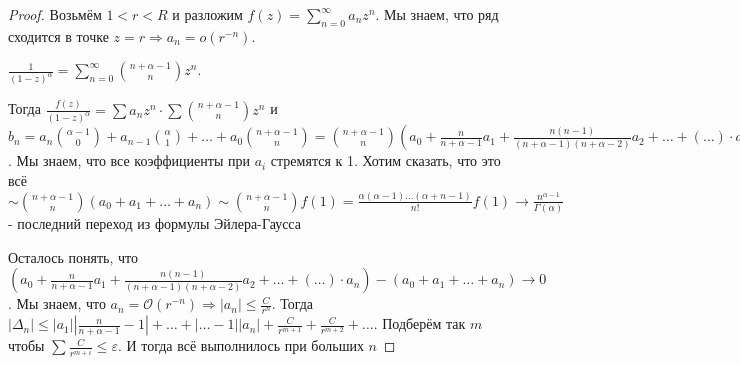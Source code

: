 \begin{proof}
    Возьмём $1 < r < R$ и разложим $f(z) = \sum_{n = 0}^{\infty} a_nz^n$. Мы знаем, что ряд сходится в точке 
    $z = r \Rightarrow a_n = o(r^{-n})$.

    $\frac{1}{(1 - z)^\alpha} = \sum_{n = 0}^{\infty} \binom{n + \alpha - 1}{n} z^n$.

    Тогда $\frac{f(z)}{(1 - z)^\alpha} = \sum a_nz^n \cdot \sum \binom{n + \alpha - 1}{n} z^n$ и $b_n = a_n \binom{\alpha - 1}{0} + a_{n - 1}\binom{\alpha}{1} + \ldots + a_0 \binom{n + \alpha - 1}{n} = 
    \binom{n + \alpha - 1}{n} (a_0 + \frac{n}{n + \alpha - 1}a_1 + \frac{n(n - 1)}{(n + \alpha - 1)(n + \alpha -2)}a_2 + \ldots + (\ldots)\cdot a_n)$. Мы знаем, что все коэффициенты при $a_i$ стремятся к 1.
    Хотим сказать, что это всё $\sim \binom{n + \alpha - 1}{n} (a_0 + a_1 + \ldots + a_n) \sim \binom{n + \alpha - 1}{n} f(1) = \frac{\alpha(\alpha - 1) \ldots (\alpha + n - 1)}{n!} f(1) \rightarrow \frac{n^{\alpha - 1}}{\Gamma(\alpha)}$ - последний переход из формулы Эйлера-Гаусса

    Осталось понять, что $(a_0 + \frac{n}{n + \alpha - 1}a_1 + \frac{n(n - 1)}{(n + \alpha - 1)(n + \alpha -2)}a_2 + \ldots + (\ldots)\cdot a_n) - (a_0 + a_1 + \ldots +a_n) \rightarrow 0$. Мы знаем, что 
    $a_n = \mathcal{O}(r^{-n}) \Rightarrow |a_n| \leqslant \frac{C}{r^n}$. Тогда
    $|\Delta_n| \leqslant |a_1| |\frac{n}{n + \alpha - 1} - 1| + \ldots + |\ldots - 1| |a_n| + \frac{C}{r^{m + 1}} + \frac{C}{r^{m + 2}} + \ldots $. Подберём так $m$ чтобы
    $\sum \frac{C}{r^{m + i}} \leqslant \varepsilon$. И тогда всё выполнилось при больших $n$
\end{proof}

